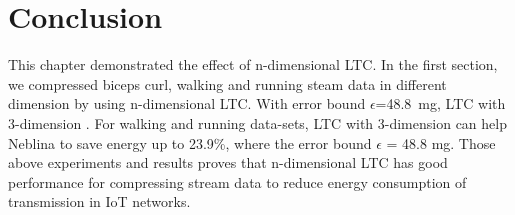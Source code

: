 \section{Conclusion}
This chapter demonstrated the effect of n-dimensional LTC. In the first section,
we compressed biceps curl, walking and running steam data in different dimension
by using n-dimensional LTC. With error bound $\epsilon$=48.8\ mg, LTC with
3-dimension . For walking and running
data-sets, LTC with 3-dimension can help Neblina to save energy up to 23.9\%,
where the error bound $\epsilon$ = 48.8 mg. Those above experiments and results
proves that n-dimensional LTC has good performance for compressing stream data
to reduce energy consumption of transmission in IoT networks.
